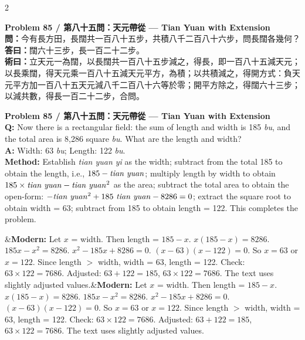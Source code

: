 \documentclass[11pt,a4paper]{article}
\newcommand{\bilingualproblem}[4]{%
  \begin{paracol}{2}
  \begin{leftcolumn}
  \noindent\textbf{\color{problemcolor}#1}\\[0.2cm]
  #2
  \end{leftcolumn}
  \switchcolumn
  \noindent\textbf{\color{problemcolor}#1}\\[0.2cm]
  #3
  \end{paracol}
  \ifx&#4&\else\vspace{0.3cm}\noindent#4\fi
  \vspace{0.5cm}
}
\newcommand{\wen}[1]{\textcolor{problemcolor}{\textbf{問：}}#1}
\newcommand{\da}[1]{\textcolor{answercolor}{\textbf{答曰：}}#1}
\newcommand{\shu}[1]{\textcolor{methodcolor}{\textbf{術曰：}}#1}
\newcommand{\wenen}[1]{\textcolor{problemcolor}{\textbf{Q:}} #1}
\newcommand{\daen}[1]{\textcolor{answercolor}{\textbf{A:}} #1}
\newcommand{\shuen}[1]{\textcolor{methodcolor}{\textbf{Method:}} #1}
\begin{document}
\bilingualproblem{Problem 85 / 第八十五問：天元帶從 --- Tian Yuan with Extension}{
\wen{今有長方田，長闊共一百八十五步，共積八千二百八十六步，問長闊各幾何？}\\[0.2cm]
\da{闊六十三步，長一百二十二步。}\\[0.2cm]
\shu{立天元一為闊，以長闊共一百八十五步減之，得長，即一百八十五減天元；以長乘闊，得天元乘一百八十五減天元平方，為積；以共積減之，得開方式：負天元平方加一百八十五天元減八千二百八十六等於零；開平方除之，得闊六十三步；以減共數，得長一百二十二步，合問。}
}{
\wenen{Now there is a rectangular field: the sum of length and width is 185 \textit{bu}, and the total area is 8,286 square \textit{bu}. What are the length and width?}\\[0.2cm]
\daen{Width: 63 \textit{bu}; Length: 122 \textit{bu}.}\\[0.2cm]
\shuen{Establish \textit{tian yuan yi} as the width; subtract from the total 185 to obtain the length, i.e., $185 - \text{\textit{tian yuan}}$; multiply length by width to obtain $185 \times \text{\textit{tian yuan}} - \text{\textit{tian yuan}}^2$ as the area; subtract the total area to obtain the open-form: $-\text{\textit{tian yuan}}^2 + 185\ \text{\textit{tian yuan}} - 8286 = 0$; extract the square root to obtain width = 63; subtract from 185 to obtain length = 122. This completes the problem.}
}{\textbf{Modern:} Let $x$ = width. Then length = $185 - x$. $x(185-x) = 8286$. $185x - x^2 = 8286$. $x^2 - 185x + 8286 = 0$. $(x-63)(x-122) = 0$. So $x = 63$ or $x = 122$. Since length $>$ width, width = 63, length = 122. Check: $63 \times 122 = 7686$. Adjusted: $63 + 122 = 185$, $63 \times 122 = 7686$. The text uses slightly adjusted values.}

\newpage
\end{document}

